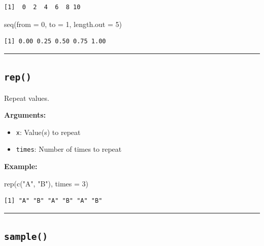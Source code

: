 \documentclass[
  letterpaper,
  DIV=11,
  numbers=noendperiod]{scrreprt}
\newenvironment{Shaded}{\begin{snugshade}}{\end{snugshade}}
\newcommand{\AttributeTok}[1]{\textcolor[rgb]{0.40,0.45,0.13}{#1}}
\newcommand{\DecValTok}[1]{\textcolor[rgb]{0.68,0.00,0.00}{#1}}
\newcommand{\FunctionTok}[1]{\textcolor[rgb]{0.28,0.35,0.67}{#1}}
\newcommand{\NormalTok}[1]{\textcolor[rgb]{0.00,0.23,0.31}{#1}}
\newcommand{\StringTok}[1]{\textcolor[rgb]{0.13,0.47,0.30}{#1}}
\providecommand{\tightlist}{%
  \setlength{\itemsep}{0pt}\setlength{\parskip}{0pt}}
\begin{document}
\begin{verbatim}
[1]  0  2  4  6  8 10
\end{verbatim}

\begin{Shaded}
\begin{Highlighting}[]
\FunctionTok{seq}\NormalTok{(}\AttributeTok{from =} \DecValTok{0}\NormalTok{, }\AttributeTok{to =} \DecValTok{1}\NormalTok{, }\AttributeTok{length.out =} \DecValTok{5}\NormalTok{)}
\end{Highlighting}
\end{Shaded}

\begin{verbatim}
[1] 0.00 0.25 0.50 0.75 1.00
\end{verbatim}

\begin{center}\rule{0.5\linewidth}{0.5pt}\end{center}

\subsection{\texorpdfstring{\texttt{rep()}}{rep()}}\label{rep}

Repeat values.

\textbf{Arguments:}

\begin{itemize}
\tightlist
\item
  \texttt{x}: Value(s) to repeat
\item
  \texttt{times}: Number of times to repeat
\end{itemize}

\textbf{Example:}

\begin{Shaded}
\begin{Highlighting}[]
\FunctionTok{rep}\NormalTok{(}\FunctionTok{c}\NormalTok{(}\StringTok{"A"}\NormalTok{, }\StringTok{"B"}\NormalTok{), }\AttributeTok{times =} \DecValTok{3}\NormalTok{)}
\end{Highlighting}
\end{Shaded}

\begin{verbatim}
[1] "A" "B" "A" "B" "A" "B"
\end{verbatim}

\begin{center}\rule{0.5\linewidth}{0.5pt}\end{center}

\subsection{\texorpdfstring{\texttt{sample()}}{sample()}}\label{sample}
\end{document}
